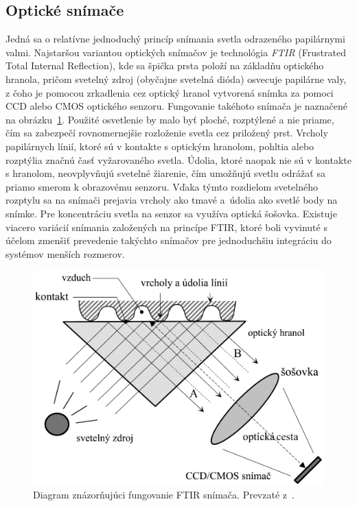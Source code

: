   \subsection{Optické snímače}
  Jedná sa o relatívne jednoduchý princíp snímania svetla odrazeného papilárnymi valmi. Najstaršou variantou optických snímačov je technológia \emph{FTIR}
  (Frustrated Total Internal Reflection), kde sa špička prsta položí na základňu optického hranola, pričom svetelný zdroj (obyčajne svetelná dióda) osvecuje
  papilárne valy, z čoho je pomocou zrkadlenia cez optický hranol vytvorená snímka za pomoci CCD alebo CMOS optického senzoru. Fungovanie takéhoto snímača
  je naznačené na obrázku~{\ref{obr:ftir_snimac}}. Použité osvetlenie by malo byť ploché, rozptýlené a nie priame, čím sa zabezpečí rovnomernejšie rozloženie
  svetla cez priložený prst. Vrcholy papilárnych línií, ktoré sú v kontakte s optickým hranolom, pohltia alebo rozptýlia značnú časť vyžarovaného svetla. Údolia,
  ktoré naopak nie sú v kontakte s hranolom, neovplyvňujú svetelné žiarenie, čím umožňujú svetlu odrážať sa priamo smerom k obrazovému senzoru. Vďaka týmto
  rozdielom svetelného rozptylu sa na snímači prejavia vrcholy ako tmavé a~údolia ako svetlé body na snímke. Pre koncentráciu svetla na senzor sa využíva
  optická šošovka. Existuje viacero variácií snímania založených na princípe FTIR, ktoré boli vyvinuté s účelom zmenšiť prevedenie takýchto snímačov
  pre jednoduchšiu integráciu do systémov menších rozmerov.

  \begin{figure}[h]
    \centering
    \includegraphics[width=0.6\linewidth]{obrazky-figures/ftir_snimac.png}
    \caption{Diagram znázorňujúci fungovanie FTIR snímača. Prevzaté z~{\cite{Handbook}}.}
    \label{obr:ftir_snimac}
  \end{figure}

